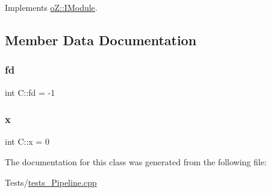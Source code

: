Implements \mbox{\hyperlink{classo_z_1_1_i_module_a3dc905faa6df5e22eecc6ffbc923fd95}{o\+Z\+::\+I\+Module}}.



\subsection{Member Data Documentation}
\mbox{\label{class_c_a7d63b9c907f2a1200cd3e173cee9751e}} 
\subsubsection{\texorpdfstring{fd}{fd}}
{\footnotesize\ttfamily int C\+::fd = -\/1}

\mbox{\label{class_c_a644bc4405a602578b65e83d317a2f3eb}} 
\subsubsection{\texorpdfstring{x}{x}}
{\footnotesize\ttfamily int C\+::x = 0}



The documentation for this class was generated from the following file\+:\begin{DoxyCompactItemize}
\item 
Tests/\mbox{\hyperlink{tests___pipeline_8cpp}{tests\+\_\+\+Pipeline.\+cpp}}\end{DoxyCompactItemize}

